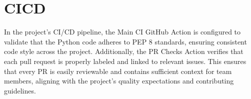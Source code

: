 \documentclass{article}
\begin{document}
\section{CICD}

In the project's CI/CD pipeline, the Main CI GitHub Action is configured to validate that the Python code adheres to PEP 8 standards, ensuring consistent code style across the project. Additionally, the PR Checks Action verifies that each pull request is properly labeled and linked to relevant issues. This ensures that every PR is easily reviewable and contains sufficient context for team members, aligning with the project's quality expectations and contributing guidelines.
\end{document}
